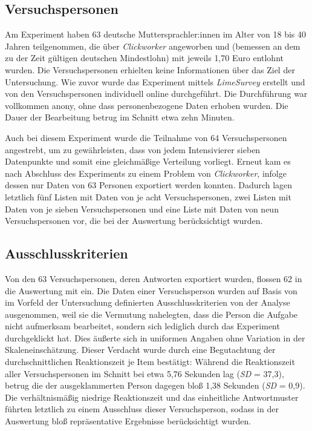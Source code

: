 \subsection{Versuchspersonen}\label{abs:Probanden2}
Am Experiment haben 63 deutsche Muttersprachler:innen im Alter von 18 bis 40 Jahren teilgenommen, die über \textit{Clickworker} angeworben und (bemessen an dem zu der Zeit gültigen deutschen Mindestlohn) mit jeweils {1,70 Euro} {entlohnt} wurden. Die Versuchspersonen erhielten keine Informationen über das Ziel der Untersuchung. Wie zuvor wurde das Experiment mittels {\textit{LimeSurvey}} erstellt und von den Versuchspersonen individuell online durchgeführt. Die Durchführung war vollkommen anony, ohne dass personenbezogene Daten erhoben wurden. Die Dauer der Bearbeitung betrug im Schnitt etwa zehn Minuten.


Auch bei diesem Experiment wurde die Teilnahme von 64 Versuchspersonen angestrebt, um zu gewährleisten, dass von jedem Intensivierer sieben Datenpunkte und somit eine gleichmäßige Verteilung vorliegt. Erneut kam es nach Abschluss des Experiments zu einem Problem von \textit{Clickworker}, infolge dessen nur Daten von 63 Personen exportiert werden konnten. Dadurch lagen letztlich fünf Listen mit Daten von je acht Versuchspersonen, zwei Listen mit Daten von je sieben Versuchspersonen und eine Liste mit Daten von neun Versuchspersonen vor, die bei der Auswertung berücksichtigt wurden.



\subsection{Ausschlusskriterien}\label{abs:Auswertungskriterien2}
Von den 63 Versuchspersonen, deren Antworten exportiert wurden, flossen 62 in die Auswertung mit ein. Die Daten einer Versuchsperson wurden auf Basis von im Vorfeld der Untersuchung definierten Ausschlusskriterien von der Analyse ausgenommen, weil sie die Vermutung nahelegten, dass die Person die Aufgabe nicht aufmerksam bearbeitet, sondern sich lediglich durch das Experiment durchgeklickt hat. Dies äußerte sich in uniformen Angaben ohne Variation in der Skaleneinschätzung. Dieser Verdacht wurde durch eine Begutachtung der durchschnittlichen Reaktionszeit je Item bestätigt: Während die Reaktionszeit aller Versuchspersonen im Schnitt bei etwa 5,76 Sekunden lag {(\textit{SD} = 37,3)}, betrug die der ausgeklammerten Person dagegen bloß 1,38 Sekunden ({\textit{SD} = 0,9}). Die verhältnismäßig niedrige Reaktionszeit und das einheitliche Antwortmuster führten letztlich zu einem Ausschluss dieser Versuchsperson, sodass in der Auswertung bloß repräsentative Ergebnisse {berücksichtigt wurden}.





